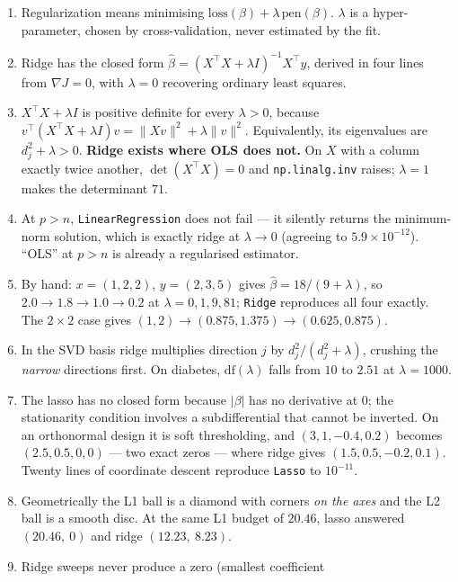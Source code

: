 \documentclass[11pt]{article}
\newcommand{\bhat}{\hat\beta}
\newcommand{\XtX}{X^{\!\top}\!X}
\newcommand{\Xty}{X^{\!\top}y}
\begin{document}
\begin{enumerate}[leftmargin=*]
  \item Regularization means minimising
    $\text{loss}(\beta) + \lambda\,\text{pen}(\beta)$. $\lambda$ is a
    hyper-parameter, chosen by cross-validation, never estimated by the fit.
  \item Ridge has the closed form
    $\bhat = (\XtX + \lambda I)^{-1}\Xty$, derived in four lines from
    $\nabla J = 0$, with $\lambda = 0$ recovering ordinary least squares.
  \item $\XtX + \lambda I$ is positive definite for every $\lambda > 0$,
    because $v^{\!\top}(\XtX + \lambda I)v = \|Xv\|^2 + \lambda\|v\|^2$.
    Equivalently, its eigenvalues are $d_j^2 + \lambda > 0$. \textbf{Ridge
    exists where OLS does not.} On $X$ with a column exactly twice another,
    $\det(\XtX) = 0$ and \texttt{np.linalg.inv} raises; $\lambda = 1$ makes
    the determinant $71$.
  \item At $p > n$, \texttt{LinearRegression} does not fail --- it silently
    returns the minimum-norm solution, which is exactly ridge at
    $\lambda \to 0$ (agreeing to $5.9\times10^{-12}$). ``OLS'' at $p>n$ is
    already a regularised estimator.
  \item By hand: $x = (1,2,2)$, $y = (2,3,5)$ gives
    $\bhat = 18/(9+\lambda)$, so $2.0 \to 1.8 \to 1.0 \to 0.2$ at
    $\lambda = 0, 1, 9, 81$; \texttt{Ridge} reproduces all four exactly. The
    $2\times2$ case gives $(1, 2) \to (0.875, 1.375) \to (0.625, 0.875)$.
  \item In the SVD basis ridge multiplies direction $j$ by
    $d_j^2/(d_j^2+\lambda)$, crushing the \emph{narrow} directions first. On
    diabetes, $\mathrm{df}(\lambda)$ falls from $10$ to $2.51$ at
    $\lambda = 1000$.
  \item The lasso has no closed form because $|\beta|$ has no derivative at
    $0$; the stationarity condition involves a subdifferential that cannot be
    inverted. On an orthonormal design it is soft thresholding, and
    $(3, 1, -0.4, 0.2)$ becomes $(2.5, 0.5, 0, 0)$ --- two exact zeros ---
    where ridge gives $(1.5, 0.5, -0.2, 0.1)$. Twenty lines of coordinate
    descent reproduce \texttt{Lasso} to $10^{-11}$.
  \item Geometrically the L1 ball is a diamond with corners \emph{on the
    axes} and the L2 ball is a smooth disc. At the same L1 budget of
    $20.46$, lasso answered $(20.46,\ 0)$ and ridge $(12.23,\ 8.23)$.
  \item Ridge sweeps never produce a zero (smallest coefficient

\end{enumerate}
\end{document}

